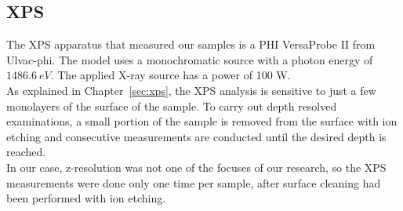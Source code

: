 \subsection{XPS}
\label{subsec:xps_setup}
The XPS apparatus that measured our samples is a PHI VersaProbe II from Ulvac-phi. The model uses a monochromatic  source with a photon energy of $1486.6 \: eV$. The applied X-ray source has a power of 100 W.
\\
As explained in Chapter~\ref{sec:xps}, the XPS analysis is sensitive to just a few monolayers of the surface of the sample. To carry out depth resolved examinations, a small portion of the sample is removed from the surface with ion etching and consecutive measurements are conducted until the desired depth is reached.
\\
In our case, z-resolution was not one of the focuses of our research, so the XPS measurements were done only one time per sample, after surface cleaning had been performed with ion etching.

